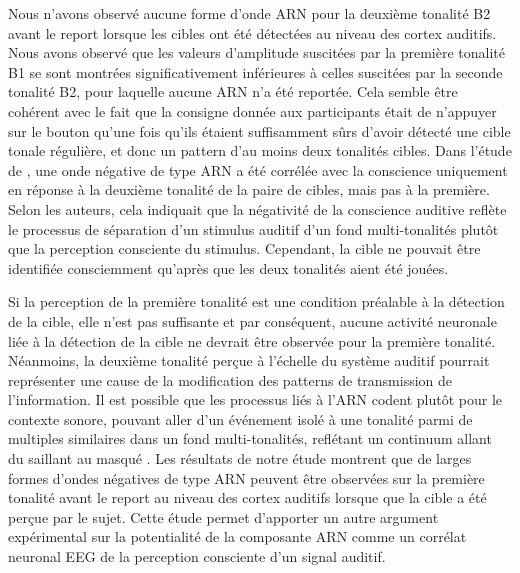 Nous n'avons observé aucune forme d'onde ARN pour la deuxième tonalité B2 avant le report lorsque les cibles ont été détectées au niveau des cortex auditifs. 
Nous avons observé que les valeurs d'amplitude suscitées par la première tonalité B1 se sont montrées significativement inférieures à celles suscitées par la seconde tonalité B2, pour laquelle aucune ARN n'a été reportée. 
Cela semble être cohérent avec le fait que la consigne donnée aux participants était de n'appuyer sur le bouton qu'une fois qu'ils étaient suffisamment sûrs d'avoir détecté une cible tonale régulière, et donc un pattern d'au moins deux tonalités cibles. 
Dans l'étude de \cite{giani2015detecting}, une onde négative de type ARN a été corrélée avec la conscience uniquement en réponse à la deuxième tonalité de la paire de cibles, mais pas à la première. 
Selon les auteurs, cela indiquait que la négativité de la conscience auditive reflète le processus de séparation d'un stimulus auditif d'un fond multi-tonalités plutôt que la perception consciente du stimulus. 
Cependant, la cible ne pouvait être identifiée consciemment qu'après que les deux tonalités aient été jouées. 

Si la perception de la première tonalité est une condition préalable à la détection de la cible, elle n'est pas suffisante et par conséquent, aucune activité neuronale liée à la détection de la cible ne devrait être observée pour la première tonalité. 
Néanmoins, la deuxième tonalité perçue à l'échelle du système auditif pourrait représenter une cause de la modification des patterns de transmission de l'information. 
Il est possible que les processus liés à l'ARN codent plutôt pour le contexte sonore, pouvant aller d'un événement isolé à une tonalité parmi de multiples similaires dans un fond multi-tonalités, reflétant un continuum allant du saillant au masqué \citep{gartner2021auditory}.
Les résultats de notre étude montrent que de larges formes d'ondes négatives de type ARN peuvent être observées sur la première tonalité avant le report au niveau des cortex auditifs lorsque que la cible a été perçue par le sujet. 
Cette étude permet d'apporter un autre argument expérimental sur la potentialité de la composante ARN comme un corrélat neuronal EEG de la perception consciente d'un signal auditif.

